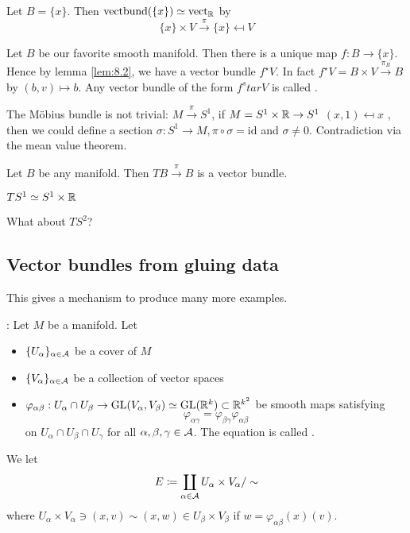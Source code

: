 \begin{example}
    Let \(B=\{x\}\). Then \(\text{vectbund}(\{x\})\simeq \text{vect}_{\mathbb{R}}\) by 
    \[\{x\}\times V \stackrel{\pi}{\to} \{x\}\mapsfrom V\]
\end{example}

\begin{example}
    Let \(B\) be our favorite smooth manifold. Then there is a unique map \(f:B\to \{x\}\).
    Hence by lemma \ref{lem:8.2}, we have a vector bundle \(f^\star V\). In fact 
    \(f^\star V= B\times V\stackrel{\pi_B}{\to} B\) by \((b,v)\mapsto b\).
    Any vector bundle of the form \(f^star V\) is called . 
\end{example}

\begin{remark}
    The Möbius bundle is not trivial:
    \(M\stackrel{\pi}{\to} S^1\), if \(M=S^1 \times \mathbb{R}\to S^1\)  \((x,1)\mapsfrom x\)
    , then we could define a section \(\sigma:S^1\to M,\pi\circ \sigma=\text{id}\) and \(\sigma\neq 0\).
    Contradiction via the mean value theorem.
\end{remark}

\begin{example}
    Let \(B\) be any manifold. Then \(TB\stackrel{\pi}{\to} B\) is a vector bundle.
\end{example}

 \(T S^1\simeq S^1\times \mathbb{R}\) 

What about \(TS^2\)?

\subsection{Vector bundles from gluing data}

This gives a mechanism to produce many more examples.

: %
Let \(M\) be a manifold. Let 
\begin{itemize}
    \item \(\{U_\alpha\}_{\alpha\in \mathcal{A}}\) be a cover of \(M\)
    \item \(\{V_\alpha\}_{\alpha\in \mathcal{A}}\) be a collection of vector spaces 
    \item \(\varphi_{\alpha\beta}:U_\alpha\cap U_\beta\to \text{GL}(V_\alpha,V_\beta)\simeq \text{GL}(\mathbb{R}^k)\subset \mathbb{R}^{k^2}\) be 
          smooth maps satisfying \[\varphi_{\alpha\gamma}=\varphi_{\beta\gamma}\varphi_{\alpha\beta}\] on  \(U_\alpha\cap U_\beta\cap U_\gamma\) for all \(\alpha,\beta,\gamma\in\mathcal{A}\). 
          The equation is called .
\end{itemize}
We let \begin{equation}
    E\coloneqq \coprod_{\alpha\in\mathcal{A}} U_\alpha \times V_\alpha /\sim     
\end{equation}
where \(U_{\alpha}\times V_\alpha \ni (x,v)\sim (x,w)\in U_\beta\times V_\beta\)
if \(w=\varphi_{\alpha\beta}(x)(v)\).

